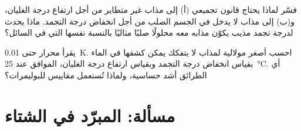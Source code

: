 \begin{exercise}[$\star\star\star$]\label{exo:b2:chemical-potential:11}
فسّر لماذا يحتاج قانون تجميعي (أ) إلى مذاب غير متطاير من أجل ارتفاع
درجة الغليان، و(ب) إلى مذاب لا يدخل في الجسم الصلب من أجل انخفاض درجة
التجمد. ماذا يحدث لدرجة تجمد مذيب يكوّن مذابه معه محلولًا صلبًا مثاليًا
بالنسبة نفسها التي في السائل؟
\end{exercise}

\begin{exercise}[$\star\star\star$]\label{exo:b2:chemical-potential:12}
يقرأ محرار حتى \qty{0.01}{K}. احسب أصغر مولالية لمذاب لا يتفكك
يمكن كشفها في الماء بقياس انخفاض درجة التجمد وبقياس ارتفاع درجة الغليان،
 الموافق عند \qty{25}{\celsius}.
أي الطرائق أشد حساسية، ولماذا تُستعمل مقاييس  للبوليمرات؟
\end{exercise}

\section{مسألة: المبرّد في الشتاء}

